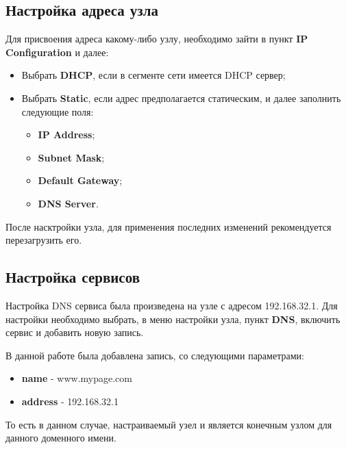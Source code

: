 \documentclass[14pt,a4paper,report]{report}
\begin{document}
\subsection{Настройка адреса узла}
Для присвоения адреса какому-либо узлу, необходимо зайти в пункт \textbf{IP Configuration} и далее:
\begin{itemize}
\item Выбрать \textbf{DHCP}, если в сегменте сети имеется DHCP сервер;
\item Выбрать \textbf{Static}, если адрес предполагается статическим, и далее заполнить следующие поля:
\begin{itemize}
\item \textbf{IP Address};
\item \textbf{Subnet Mask};
\item \textbf{Default Gateway};
\item \textbf{DNS Server}.
\end{itemize}
\end{itemize}
После насктройки узла, для применения последних изменений рекомендуется перезагрузить его.

\subsection{Настройка сервисов}
Настройка DNS сервиса была произведена на узле с адресом 192.168.32.1. Для настройки необходимо выбрать, в меню настройки узла, пункт \textbf{DNS}, включить сервис и добавить новую запись. 

В данной работе была добавлена запись, со следующими параметрами:
\begin{itemize}
\item \textbf{name} - www.mypage.com
\item \textbf{address} - 192.168.32.1
\end{itemize}
То есть в данном случае, настраиваемый узел и является конечным узлом для данного доменного имени.
\end{document}

